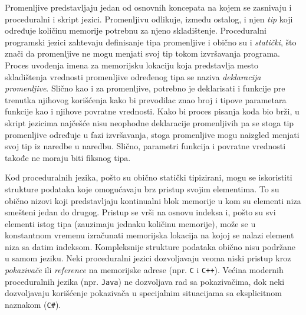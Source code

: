 Promenljive predstavljaju jedan od osnovnih koncepata na kojem se zasnivaju i proceduralni i skript jezici. Promenljivu odlikuje, između ostalog, i njen \emph{tip} koji određuje količinu memorije potrebnu za njeno skladištenje. Proceduralni programski jezici zahtevaju definisanje tipa promenljive i obično su i \emph{statički}, što znači da promenljive ne mogu menjati svoj tip tokom izvršavanja programa. Proces uvođenja imena za memorijsku lokaciju koja predstavlja mesto skladištenja vrednosti promenljive određenog tipa se naziva \emph{deklaracija promenljive}. Slično kao i za promenljive, potrebno je deklarisati i funkcije pre trenutka njihovog korišćenja kako bi prevodilac znao broj i tipove parametara funkcije kao i njihove povratne vrednosti. Kako bi proces pisanja koda bio brži, u skript jezicima najčešće nisu neophodne deklaracije promenljivih pa se stoga tip promenljive određuje u fazi izvršavanja, stoga promenljive mogu naizgled menjati svoj tip iz naredbe u naredbu. Slično, parametri funkcija i povratne vrednosti takođe ne moraju biti fiksnog tipa. 

Kod proceduralnih jezika, pošto su obično statički tipizirani, mogu se iskoristiti strukture podataka koje omogućavaju brz pristup svojim elementima. To su obično nizovi koji predstavljaju kontinualni blok memorije u kom su elementi niza smešteni jedan do drugog. Pristup se vrši na osnovu indeksa i, pošto su svi elementi istog tipa (zauzimaju jednaku količinu memorije), može se u konstantnom vremenu izračunati memorijska lokacija na kojoj se nalazi element niza sa datim indeksom. Kompleksnije strukture podataka obično nisu podržane u samom jeziku. Neki proceduralni jezici dozvoljavaju veoma niski pristup kroz \emph{pokazivače} ili \emph{reference} na memorijske adrese (npr. \texttt{C} i \texttt{C++}). Većina modernih proceduralnih jezika (npr. \texttt{Java}) ne dozvoljava rad sa pokazivačima, dok neki dozvoljavaju korišćenje pokazivača u specijalnim situacijama sa eksplicitnom naznakom (\texttt{C\#}).

